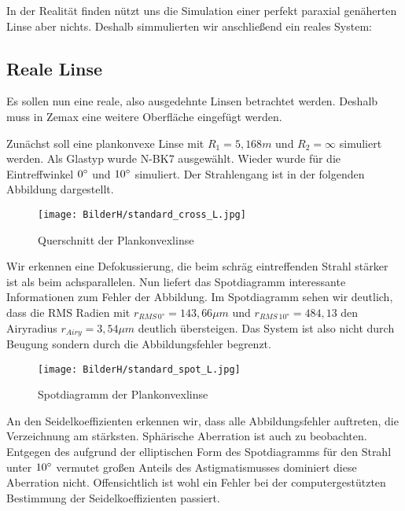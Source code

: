 \documentclass[twoside,colorback,accentcolor=tud4c,11pt]{tudreport}
\begin{document}
		In der Realität finden nützt uns die Simulation einer perfekt paraxial genäherten Linse aber nichts. Deshalb simmulierten wir anschließend ein reales System:
		
		\subsection{Reale Linse}
		
		Es sollen nun eine reale, also ausgedehnte Linsen betrachtet werden. Deshalb muss in Zemax eine weitere Oberfläche eingefügt werden. 
		
		Zunächst soll eine plankonvexe Linse mit $R_1 = 5,168 m$ und $R_2 = \infty$ simuliert werden. Als Glastyp wurde N-BK7 ausgewählt. Wieder wurde für die Eintreffwinkel $0\degree$ und $10\degree$ simuliert. Der Strahlengang ist in der folgenden Abbildung dargestellt.
		
		
		\begin{figure}[H]
\centering
   	\begin{minipage}[b]{\textwidth}
\centering   	\texttt{[image: BilderH/standard\_cross\_L.jpg]}
   	\caption{Querschnitt der Plankonvexlinse}
  	\end{minipage}
\end{figure}
				
		
		Wir erkennen eine Defokussierung, die beim schräg eintreffenden Strahl stärker ist als beim achsparallelen.
	Nun liefert das Spotdiagramm interessante Informationen zum Fehler der Abbildung. Im Spotdiagramm sehen wir deutlich, dass die RMS Radien mit $r_{RMS \, 0°} = 143,66 \mu m $ und $r_{RMS \, 10°} = 484,13 $ den Airyradius $r_{Airy} = 3,54 \mu m$ deutlich übersteigen. Das System ist also nicht durch Beugung sondern durch die Abbildungsfehler begrenzt.
	
		\begin{figure}[H]
\centering
   	\begin{minipage}[b]{\textwidth}
\centering   	\texttt{[image: BilderH/standard\_spot\_L.jpg]}
   	\caption{Spotdiagramm der Plankonvexlinse}
  	\end{minipage}
\end{figure}
		
	An den Seidelkoeffizienten erkennen wir, dass alle Abbildungsfehler auftreten, die Verzeichnung am stärksten. Sphärische Aberration ist auch zu beobachten. Entgegen des aufgrund der elliptischen Form des Spotdiagramms für den Strahl unter $10\degree$ vermutet großen Anteils des Astigmatismusses dominiert diese Aberration nicht. Offensichtlich ist wohl ein Fehler bei der computergestützten Bestimmung der Seidelkoeffizienten passiert.
	
\end{document}
